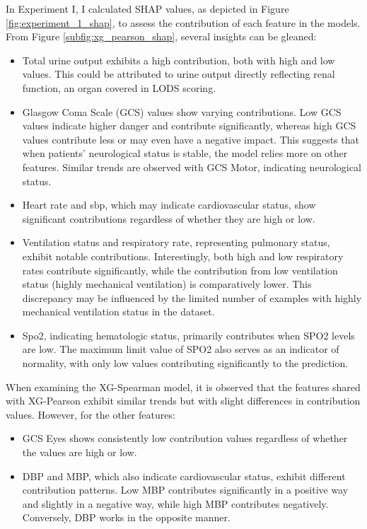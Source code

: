 \documentclass[12pt,a4paper,english
]{tunithesis}
\begin{document}
In Experiment I, I calculated SHAP values, as depicted in Figure \ref{fig:experiment_1_shap}, to assess the contribution of each feature in the models. From Figure \ref{subfig:xg_pearson_shap}, several insights can be gleaned:
\begin{itemize}
\item Total urine output exhibits a high contribution, both with high and low values. This could be attributed to urine output directly reflecting renal function, an organ covered in LODS scoring.
\item Glasgow Coma Scale (GCS) values show varying contributions. Low GCS values indicate higher danger and contribute significantly, whereas high GCS values contribute less or may even have a negative impact. This suggests that when patients' neurological status is stable, the model relies more on other features. 
Similar trends are observed with GCS Motor, indicating neurological status.
\item Heart rate and sbp, which may indicate cardiovascular status, show significant contributions regardless of whether they are high or low.
\item Ventilation status and respiratory rate, representing pulmonary status, exhibit notable contributions. Interestingly, both high and low respiratory rates contribute significantly, while the contribution from low ventilation status (highly mechanical ventilation) is comparatively lower. This discrepancy may be influenced by the limited number of examples with highly mechanical ventilation status in the dataset.
\item Spo2, indicating hematologic status, primarily contributes when SPO2 levels are low. The maximum limit value of SPO2 also serves as an indicator of normality, with only low values contributing significantly to the prediction.
\end{itemize}

When examining the XG-Spearman model, it is observed that the features shared with XG-Pearson exhibit similar trends but with slight differences in contribution values. However, for the other features:
\begin{itemize}
\item GCS Eyes shows consistently low contribution values regardless of whether the values are high or low.
\item DBP and MBP, which also indicate cardiovascular status, exhibit different contribution patterns. Low MBP contributes significantly in a positive way and slightly in a negative way, while high MBP contributes negatively. Conversely, DBP works in the opposite manner.
\end{itemize}
\end{document}
